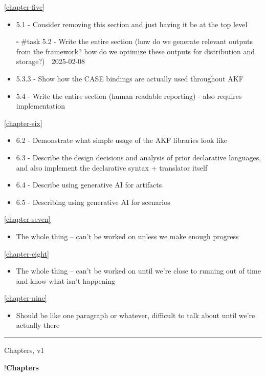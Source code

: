 \autoref{chapter-five}

\begin{itemize}
\tightlist
\item
  5.1 - Consider removing this section and just having it be at the top
  level
\item[$\square$]
  \#task 5.2 - Write the entire section (how do we generate relevant
  outputs from the framework? how do we optimize these outputs for
  distribution and storage?) 📅 2025-02-08
\item
  5.3.3 - Show how the CASE bindings are actually used throughout AKF
\item
  5.4 - Write the entire section (human readable reporting) - also
  requires implementation
\end{itemize}

\autoref{chapter-six}

\begin{itemize}
\tightlist
\item
  6.2 - Demonstrate what simple usage of the AKF libraries look like
\item
  6.3 - Describe the design decisions and analysis of prior declarative
  languages, and also implement the declarative syntax + translator
  itself
\item
  6.4 - Describe using generative AI for artifacts
\item
  6.5 - Describing using generative AI for scenarios
\end{itemize}

\autoref{chapter-seven}

\begin{itemize}
\tightlist
\item
  The whole thing -- can't be worked on unless we make enough progress
\end{itemize}

\autoref{chapter-eight}

\begin{itemize}
\tightlist
\item
  The whole thing -- can't be worked on until we're close to running out
  of time and know what isn't happening
\end{itemize}

\autoref{chapter-nine}

\begin{itemize}
\tightlist
\item
  Should be like one paragraph or whatever, difficult to talk about
  until we're actually there
\end{itemize}

\begin{center}\rule{0.5\linewidth}{0.5pt}\end{center}

Chapters, v1

!\textbf{Chapters}
